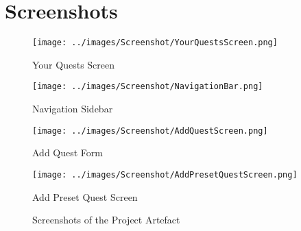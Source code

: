 \chapter{Screenshots}

\begin{figure}[ht] 
  \begin{minipage}[b]{0.45\linewidth}
    \centering
    \texttt{[image: ../images/Screenshot/YourQuestsScreen.png]} 
    \caption{Your Quests Screen} 
    \vspace{4ex}
  \end{minipage}%
  \begin{minipage}[b]{0.45\linewidth}
    \centering
    \texttt{[image: ../images/Screenshot/NavigationBar.png]}
    \caption{Navigation Sidebar} 
    \vspace{4ex}
  \end{minipage} 
  \begin{minipage}[b]{0.45\linewidth}
    \centering
    \texttt{[image: ../images/Screenshot/AddQuestScreen.png]}
    \caption{Add Quest Form} 
    \vspace{4ex}
  \end{minipage}%
  \begin{minipage}[b]{0.45\linewidth}
    \centering
    \texttt{[image: ../images/Screenshot/AddPresetQuestScreen.png]}
    \caption{Add Preset Quest Screen} 
    \vspace{4ex}
  \end{minipage} 
  \caption{Screenshots of the Project Artefact}
\end{figure}